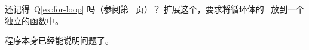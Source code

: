 \begin{Exercise}[title={For-loop II},difficulty=1]
\label{ex:for-loop II}
\Question 还记得~Q\ref{ex:for-loop} 吗（参阅第~\pageref{ex;for-loop} 页）？
扩展这个，要求将循环体的~ 放到一个独立的函数中。
\end{Exercise}

\begin{Answer}
\begin{minipage}{\textwidth}

\end{minipage}
程序本身已经能说明问题了。
\end{Answer}

